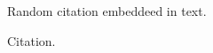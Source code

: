 \documentclass{article}
\begin{document}
Random citation \autocite[1]{DUMMY:1} embeddeed in text.

Citation\autocite[2]{greenwade93}.

\newpage

\printbibliography
\end{document}
